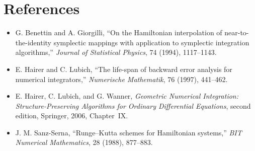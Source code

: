 \documentclass[11pt,a4paper]{article}
\theoremstyle{definition}
\theoremstyle{remark}
\begin{document}
\section*{References}

\begin{itemize}
 \item G. Benettin and A. Giorgilli,
       ``On the Hamiltonian interpolation of near-to-the-identity symplectic
       mappings with application to symplectic integration algorithms,''
       \emph{Journal of Statistical Physics}, 74 (1994), 1117--1143.
 \item E. Hairer and C. Lubich,
       ``The life-span of backward error analysis for numerical integrators,''
       \emph{Numerische Mathematik}, 76 (1997), 441--462.
 \item E. Hairer, C. Lubich, and G. Wanner,
       \emph{Geometric Numerical Integration: Structure-Preserving Algorithms
       for Ordinary Differential Equations}, second edition, Springer, 2006,
       Chapter~IX.
 \item J. M. Sanz-Serna,
       ``Runge--Kutta schemes for Hamiltonian systems,''
       \emph{BIT Numerical Mathematics}, 28 (1988), 877--883.
\end{itemize}
\end{document}
